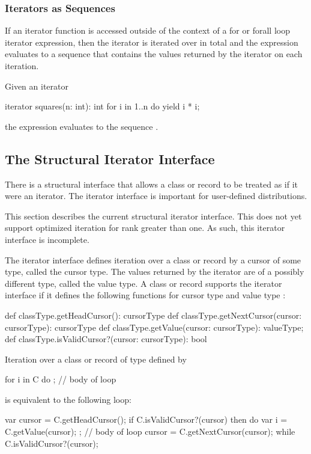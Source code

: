 \subsubsection{Iterators as Sequences}
\label{Iterators_as_Sequences}

If an iterator function is accessed outside of the context of a for or
forall loop iterator expression, then the iterator is iterated over in
total and the expression evaluates to a sequence that contains the
values returned by the iterator on each iteration.
\begin{example}
Given an iterator
\begin{chapel}
iterator squares(n: int): int {
  for i in 1..n do
    yield i * i;
}
\end{chapel}
the expression  evaluates to the sequence .
\end{example}

\subsection{The Structural Iterator Interface}
\label{Iterator_Interface}

There is a structural interface that allows a class or record to be
treated as if it were an iterator.  The iterator interface is
important for user-defined distributions.

\begin{implementation}
This section describes the current structural iterator interface.
This does not yet support optimized iteration for rank greater than
one.  As such, this iterator interface is incomplete.
\end{implementation}

The iterator interface defines iteration over a class or record by a
cursor of some type, called the cursor type.  The values returned by
the iterator are of a possibly different type, called the value type.
A class or record  supports the iterator interface if
it defines the following functions for cursor type 
and value type :
\begin{chapel}
def classType.getHeadCursor(): cursorType
def classType.getNextCursor(cursor: cursorType): cursorType
def classType.getValue(cursor: cursorType): valueType;
def classType.isValidCursor?(cursor: cursorType): bool
\end{chapel}

Iteration over a class or record  of type 
defined by
\begin{chapel}
for i in C do
  ; // body of loop
\end{chapel}
is equivalent to the following loop:
\begin{chapel}
var cursor = C.getHeadCursor();
if C.isValidCursor?(cursor) then do {
  var i = C.getValue(cursor);
  ; // body of loop
  cursor = C.getNextCursor(cursor);
} while C.isValidCursor?(cursor);
\end{chapel}
